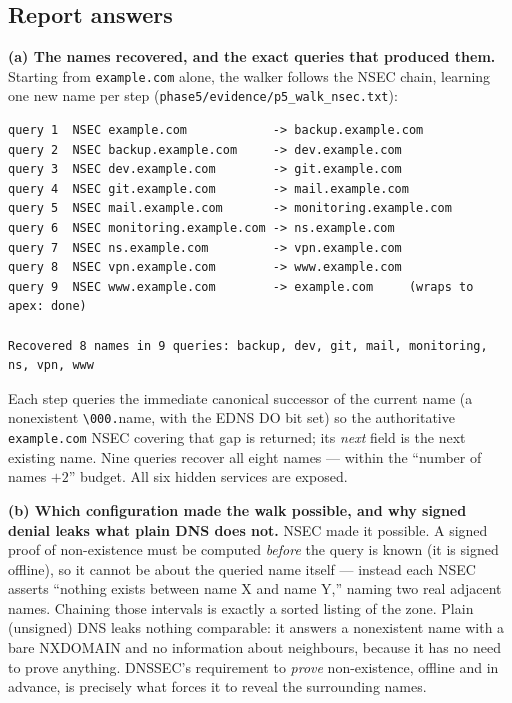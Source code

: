 \documentclass[11pt,a4paper]{article}
\begin{document}
\subsection{Report answers}

\textbf{(a) The names recovered, and the exact queries that produced them.} Starting from
\texttt{example.com} alone, the walker follows the NSEC chain, learning one new name per step
(\texttt{phase5/evidence/p5\_walk\_nsec.txt}):
\begin{lstlisting}
query 1  NSEC example.com            -> backup.example.com
query 2  NSEC backup.example.com     -> dev.example.com
query 3  NSEC dev.example.com        -> git.example.com
query 4  NSEC git.example.com        -> mail.example.com
query 5  NSEC mail.example.com       -> monitoring.example.com
query 6  NSEC monitoring.example.com -> ns.example.com
query 7  NSEC ns.example.com         -> vpn.example.com
query 8  NSEC vpn.example.com        -> www.example.com
query 9  NSEC www.example.com        -> example.com     (wraps to apex: done)

Recovered 8 names in 9 queries: backup, dev, git, mail, monitoring, ns, vpn, www
\end{lstlisting}
Each step queries the immediate canonical successor of the current name (a nonexistent
\texttt{\textbackslash000.}name, with the EDNS DO bit set) so the authoritative \texttt{example.com}
NSEC covering that gap is returned; its \emph{next} field is the next existing name. Nine queries
recover all eight names --- within the ``number of names $+2$'' budget. All six hidden services are
exposed.

\textbf{(b) Which configuration made the walk possible, and why signed denial leaks what plain DNS
does not.} NSEC made it possible. A signed proof of non-existence must be computed \emph{before} the
query is known (it is signed offline), so it cannot be about the queried name itself --- instead each
NSEC asserts ``nothing exists between name X and name Y,'' naming two real adjacent names. Chaining
those intervals is exactly a sorted listing of the zone. Plain (unsigned) DNS leaks nothing
comparable: it answers a nonexistent name with a bare NXDOMAIN and no information about neighbours,
because it has no need to prove anything. DNSSEC's requirement to \emph{prove} non-existence, offline
and in advance, is precisely what forces it to reveal the surrounding names.
\end{document}
